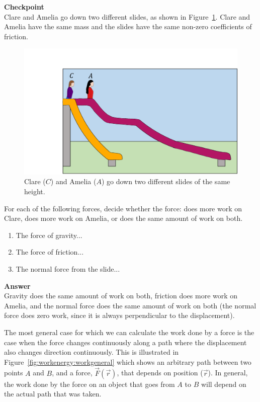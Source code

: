 \begin{framed}
\textbf{Checkpoint}\\
Clare and Amelia go down two different slides, as shown in Figure~\ref{fig:workenergy:slidecheckpoint}. Clare and Amelia have the same mass and the slides have the same non-zero coefficients of friction.

\begin{figure}[!htbp]
\centering
\includegraphics[width=0.5\linewidth]{files/slidecheckpoint-00df72a2d5b8afc63acc302203ecce5c.png}
\caption[]{Clare ($C$) and Amelia ($A$) go down two different slides of the same height.}
\label{fig:workenergy:slidecheckpoint}
\end{figure}

For each of the following forces, decide whether the force: does more work on Clare, does more work on Amelia, or does the same amount of work on both.

\begin{enumerate}
\item The force of gravity...
\item The force of friction...
\item The normal force from the slide...
\end{enumerate}

\begin{framed}
\textbf{Answer}\\
Gravity does the same amount of work on both, friction does more work on Amelia, and the normal force does the same amount of work on both (the normal force does zero work, since it is always perpendicular to the displacement).
\end{framed}
\end{framed}

The most general case for which we can calculate the work done by a force is the case when the force changes continuously along a path where the displacement also changes direction continuously. This is illustrated in Figure~\ref{fig:workenergy:workgeneral} which shows an arbitrary path between two points $A$ and $B$, and a force, $\vec F(\vec r)$, that depends on position ($\vec r$). In general, the work done by the force on an object that goes from $A$ to $B$ will depend on the actual path that was taken.

